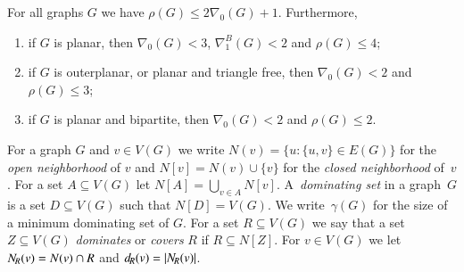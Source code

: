 %
%
\begin{lemma}\label{lem:bounds}
For all graphs $G$ we have $\rho(G)\leq 2\nabla_0(G)+1$. Furthermore,
  \begin{enumerate}
    \item if $G$ is planar, then $\nabla_0(G)<3$, $\nabla_1^B(G)<2$ and $\rho(G)\le 4$;
    \item if $G$ is outerplanar, or planar and triangle free, then $\nabla_0(G)<2$ and $\rho(G)\le 3$;
    \item if $G$ is planar and bipartite, then $\nabla_0(G)<2$ and $\rho(G)\le 2$.
  \end{enumerate}
\end{lemma}

For a graph $G$ and $v\in V(G)$ we write
$N(v)=\{u\colon\{u,v\}\in E(G)\}$ for the \emph{open neighborhood} of $v$
and $N[v]=N(v)\cup\{v\}$ for the \emph{closed neighborhood}
of~$v$. For a set $A\subseteq V(G)$ let $N[A]=\bigcup_{v\in A}N[v]$.
A~\emph{dominating set} in a graph~$G$ is a set $D\subseteq V(G)$ such
that $N[D]=V(G)$. We write~$\gamma(G)$ for the size of a minimum
dominating set of $G$. For a set $R\subseteq V(G)$ we say that a set
$Z\subseteq V(G)$ \emph{dominates} or \emph{covers}
$R$ if $R\subseteq N[Z]$. For $v\in V(G)$ we let 
$N_{\hspace{-1pt}R}(v)=N(v)\cap R$ and $d_{\hspace{-1pt}R}(v)=|N_{\hspace{-1pt}R}(v)|$. 


